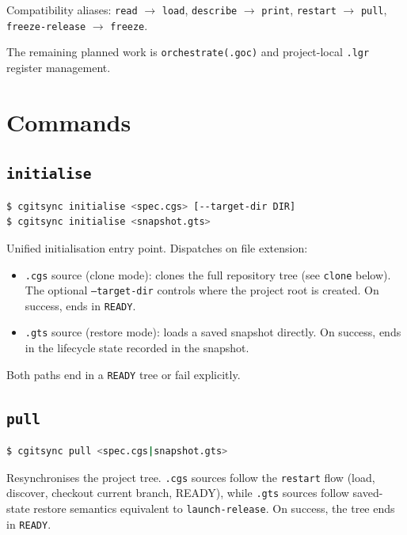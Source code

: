 Compatibility aliases: \texttt{read} $\rightarrow$ \texttt{load},
\texttt{describe} $\rightarrow$ \texttt{print}, \texttt{restart} $\rightarrow$
\texttt{pull}, \texttt{freeze-release} $\rightarrow$ \texttt{freeze}.

The remaining planned work is \texttt{orchestrate(.goc)} and project-local
\texttt{.lgr} register management.

\section{Commands}

\subsection{\texttt{initialise}}

\begin{lstlisting}[language=bash]
$ cgitsync initialise <spec.cgs> [--target-dir DIR]
$ cgitsync initialise <snapshot.gts>
\end{lstlisting}

Unified initialisation entry point.  Dispatches on file extension:

\begin{itemize}
  \item \texttt{.cgs} source (clone mode): clones the full repository tree
    (see \texttt{clone} below). The optional \texttt{--target-dir} controls
    where the project root is created.  On success, ends in \texttt{READY}.
  \item \texttt{.gts} source (restore mode): loads a saved snapshot directly.
    On success, ends in the lifecycle state recorded in the snapshot.
\end{itemize}

Both paths end in a \texttt{READY} tree or fail explicitly.

\subsection{\texttt{pull}}

\begin{lstlisting}[language=bash]
$ cgitsync pull <spec.cgs|snapshot.gts>
\end{lstlisting}

Resynchronises the project tree.  \texttt{.cgs} sources follow the
\texttt{restart} flow (load, discover, checkout current branch, READY), while
\texttt{.gts} sources follow saved-state restore semantics equivalent to
\texttt{launch-release}.  On success, the tree ends in \texttt{READY}.

